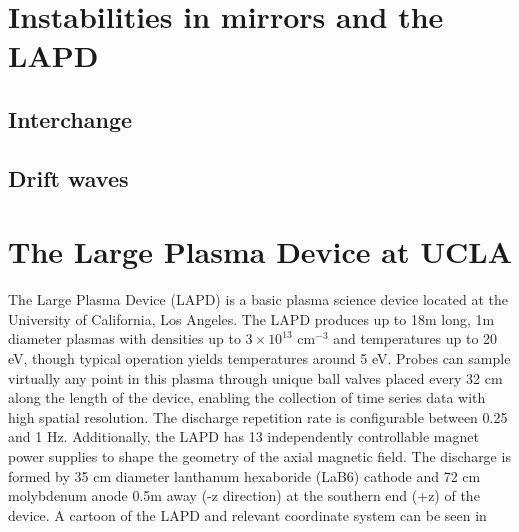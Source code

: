 %
%
%

\section{Instabilities in mirrors and the LAPD}

\subsection{Interchange}

\subsection{Drift waves}

\section{The Large Plasma Device at UCLA}

The Large Plasma Device (LAPD)\cite{gekelman_upgraded_2016,qian_design_2023} is a basic plasma science device located at the University of California, Los Angeles. The LAPD produces up to 18m long, 1m diameter plasmas  with densities up to $3 \times 10^{13}$ cm$^{-3}$ and temperatures up to 20 eV, though typical operation yields temperatures around 5 eV. Probes can sample virtually any point in this plasma through  unique ball valves placed every 32 cm along the length of the device, enabling the collection of time series data with high spatial resolution. The discharge repetition rate is configurable between 0.25 and 1 Hz. Additionally, the LAPD has 13 independently controllable magnet power supplies to shape the geometry of the axial magnetic field. The discharge is formed by 35 cm diameter lanthanum hexaboride (LaB6) cathode\cite{qian_design_2023} and 72 cm molybdenum anode 0.5m away (-z direction) at the southern end (+z) of the device. A cartoon of the LAPD and relevant coordinate system can be seen in 


